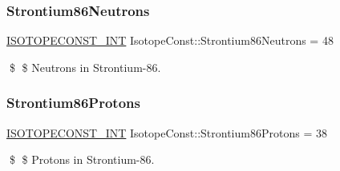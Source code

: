 \subsubsection{\texorpdfstring{Strontium86\+Neutrons}{Strontium86Neutrons}}
{\footnotesize\ttfamily \mbox{\hyperlink{group___isotope_const-_macros_ga5f18360b3e99483a35c32d789e62621c}{I\+S\+O\+T\+O\+P\+E\+C\+O\+N\+S\+T\+\_\+\+I\+NT}} Isotope\+Const\+::\+Strontium86\+Neutrons = 48}

\$ \$ Neutrons in Strontium-\/86. \mbox{\label{group___isotope_const-_strontium-_sr86_gab70717191446bddb4560fdc2c8ab2d0a}} 
\subsubsection{\texorpdfstring{Strontium86\+Protons}{Strontium86Protons}}
{\footnotesize\ttfamily \mbox{\hyperlink{group___isotope_const-_macros_ga5f18360b3e99483a35c32d789e62621c}{I\+S\+O\+T\+O\+P\+E\+C\+O\+N\+S\+T\+\_\+\+I\+NT}} Isotope\+Const\+::\+Strontium86\+Protons = 38}

\$ \$ Protons in Strontium-\/86. 
